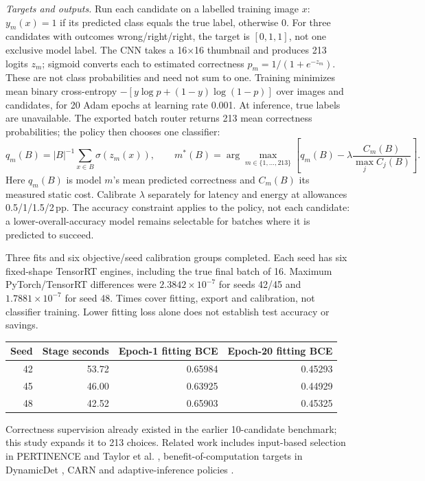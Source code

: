 \documentclass[10pt,a4paper]{article}
\newcommand{\pp}{\,pp}
\begin{document}
\textit{Targets and outputs.} Run each candidate on a labelled training image $x$: $y_m(x)=1$ if its predicted class equals the true label, otherwise 0. For three candidates with outcomes wrong/right/right, the target is $[0,1,1]$, not one exclusive model label. The CNN takes a 16$\times$16 thumbnail and produces 213 logits $z_m$; sigmoid converts each to estimated correctness $p_m=1/(1+e^{-z_m})$. These are not class probabilities and need not sum to one. Training minimizes mean binary cross-entropy $-[y\log p+(1-y)\log(1-p)]$ over images and candidates, for 20 Adam epochs at learning rate 0.001. At inference, true labels are unavailable. The exported batch router returns 213 mean correctness probabilities; the policy then chooses one classifier:
\[
q_m(B)=|B|^{-1}\sum_{x\in B}\sigma(z_m(x)),\qquad
m^*(B)=\arg\max_{m\in\{1,\ldots,213\}}\left[q_m(B)-\lambda\frac{C_m(B)}{\max_j C_j(B)}\right].
\]
Here $q_m(B)$ is model $m$'s mean predicted correctness and $C_m(B)$ its measured static cost. Calibrate $\lambda$ separately for latency and energy at allowances 0.5/1/1.5/2\pp. The accuracy constraint applies to the policy, not each candidate: a lower-overall-accuracy model remains selectable for batches where it is predicted to succeed.

Three fits and six objective/seed calibration groups completed. Each seed has six fixed-shape TensorRT engines, including the true final batch of 16. Maximum PyTorch/TensorRT differences were $2.3842\times10^{-7}$ for seeds 42/45 and $1.7881\times10^{-7}$ for seed 48. Times cover fitting, export and calibration, not classifier training. Lower fitting loss alone does not establish test accuracy or savings.
\begin{center}\small
\begin{tabular}{@{}rrrr@{}}
\toprule Seed & Stage seconds & Epoch-1 fitting BCE & Epoch-20 fitting BCE\\
\midrule42&53.72&0.65984&0.45293\\45&46.00&0.63925&0.44929\\48&42.52&0.65903&0.45325\\\bottomrule
\end{tabular}
\end{center}

Correctness supervision already existed in the earlier 10-candidate benchmark; this study expands it to 213 choices. Related work includes input-based selection in PERTINENCE \cite{pertinence} and Taylor et al. \cite{taylor}, benefit-of-computation targets in DynamicDet \cite{dynamicdet}, CARN \cite{carn} and adaptive-inference policies \cite{adaptive}.
\end{document}
